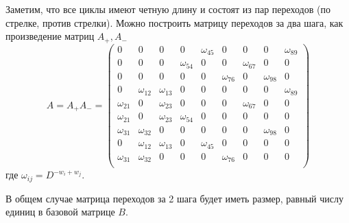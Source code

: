 \documentclass[specification,annotation,times]{itmo-student-thesis}
\begin{document}
Заметим, что все циклы имеют четную длину и состоят из пар переходов
(по стрелке, против стрелки). Можно построить матрицу переходов за
два шага, как произведение матриц $A_+, A_-$
\[
A=A_+A_{-}=\begin{pmatrix}
     0    & 0 &    0 &    0 &    \omega_{45}   &  0 &    0 &    0 &    \omega_{89}\\
     0&     0&     0&     \omega_{54} &    0  &   0  &   \omega_{67}  &   0  &   0 \\
     0&     0&     0&     0&     0&     \omega_{76} &     0&      \omega_{98}   &   0\\
     0&     \omega_{12}      & \omega_{13}  &    0 &    0  &   0 &    0  &   0      & \omega_{89} \\
\omega_{21}     &0     & \omega_{23}     &0   &0   &0     & \omega_{67}     &0 &   0\\
\omega_{21}     &0     & \omega_{23}      & \omega_{54}    &0   &0   &0   &0   & 0\\
\omega_{31}     & \omega_{32}  &0    &0   &0   &0   &0     & \omega_{98}     & 0\\
    0     & \omega_{12}      & \omega_{13}     &0    & \omega_{45}     &0   &0   &0   & 0\\
\omega_{31}      & \omega_{32}     &0   &0   &0     & \omega_{76}     &0   &0   & 0\\
\end{pmatrix}
\]
где
$\omega_{ij}=D^{-w_i+w_j}$.
%

В общем случае матрица переходов за 2 шага будет иметь размер, равный числу единиц в 
базовой матрице $B$. 
\end{document}
